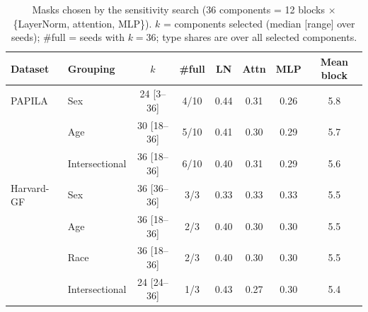 \begin{table}[t]
\centering
\caption{Masks chosen by the sensitivity search (36 components = 12 blocks $\times$ \{LayerNorm, attention, MLP\}). $k$ = components selected (median [range] over seeds); \#full = seeds with $k{=}36$; type shares are over all selected components.}
\label{tab:masks}
\small
\begin{tabular}{llcccccc}
\toprule
Dataset & Grouping & $k$ & \#full & LN & Attn & MLP & Mean block \\
\midrule
PAPILA & Sex & 24 [3--36] & 4/10 & 0.44 & 0.31 & 0.26 & 5.8 \\
 & Age & 30 [18--36] & 5/10 & 0.41 & 0.30 & 0.29 & 5.7 \\
 & Intersectional & 36 [18--36] & 6/10 & 0.40 & 0.31 & 0.29 & 5.6 \\
\midrule
Harvard-GF & Sex & 36 [36--36] & 3/3 & 0.33 & 0.33 & 0.33 & 5.5 \\
 & Age & 36 [18--36] & 2/3 & 0.40 & 0.30 & 0.30 & 5.5 \\
 & Race & 36 [18--36] & 2/3 & 0.40 & 0.30 & 0.30 & 5.5 \\
 & Intersectional & 24 [24--36] & 1/3 & 0.43 & 0.27 & 0.30 & 5.4 \\
\bottomrule
\end{tabular}
\end{table}

